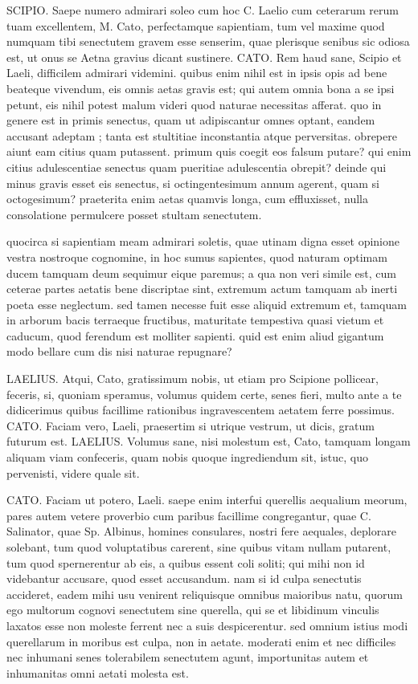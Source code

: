  SCIPIO. Saepe numero admirari soleo cum hoc C. Laelio cum ceterarum rerum tuam excellentem, M. Cato, perfectamque sapientiam, tum vel maxime quod numquam tibi senectutem gravem esse senserim, quae plerisque senibus sic odiosa est, ut onus se Aetna gravius dicant sustinere. CATO. Rem haud sane, Scipio et Laeli, difficilem admirari videmini. quibus enim nihil est in ipsis opis ad bene beateque vivendum, eis omnis aetas gravis est; qui autem omnia bona a se ipsi petunt, eis nihil potest malum videri quod naturae necessitas afferat. quo in genere est in primis senectus, quam ut adipiscantur omnes optant, eandem accusant adeptam ; tanta est stultitiae inconstantia atque perversitas. obrepere aiunt eam citius quam putassent. primum quis coegit eos falsum putare? qui enim citius adulescentiae senectus quam pueritiae adulescentia obrepit? deinde qui minus gravis esset eis senectus, si octingentesimum annum agerent, quam si octogesimum? praeterita enim aetas quamvis longa, cum effluxisset, nulla consolatione permulcere posset stultam senectutem.

 quocirca si sapientiam meam admirari soletis, quae utinam digna esset opinione vestra nostroque cognomine, in hoc sumus sapientes, quod naturam optimam ducem tamquam deum sequimur eique paremus; a qua non veri simile est, cum ceterae partes aetatis bene discriptae sint, extremum actum tamquam ab inerti poeta esse neglectum. sed tamen necesse fuit esse aliquid extremum et, tamquam in arborum bacis terraeque fructibus, maturitate tempestiva quasi vietum et caducum, quod ferendum est molliter sapienti. quid est enim aliud gigantum modo bellare cum dis nisi naturae repugnare?

 LAELIUS. Atqui, Cato, gratissimum nobis, ut etiam pro Scipione pollicear, feceris, si, quoniam speramus, volumus quidem certe, senes fieri, multo ante a te didicerimus quibus facillime rationibus ingravescentem aetatem ferre possimus. CATO. Faciam vero, Laeli, praesertim si utrique vestrum, ut dicis, gratum futurum est. LAELIUS. Volumus sane, nisi molestum est, Cato, tamquam longam aliquam viam confeceris, quam nobis quoque ingrediendum sit, istuc, quo pervenisti, videre quale sit.

 CATO. Faciam ut potero, Laeli. saepe enim interfui querellis aequalium meorum, pares autem vetere proverbio cum paribus facillime congregantur, quae C. Salinator, quae Sp. Albinus, homines consulares, nostri fere aequales, deplorare solebant, tum quod voluptatibus carerent, sine quibus vitam nullam putarent, tum quod spernerentur ab eis, a quibus essent coli soliti; qui mihi non id videbantur accusare, quod esset accusandum. nam si id culpa senectutis accideret, eadem mihi usu venirent reliquisque omnibus maioribus natu, quorum ego multorum cognovi senectutem sine querella, qui se et libidinum vinculis laxatos esse non moleste ferrent nec a suis despicerentur. sed omnium istius modi querellarum in moribus est culpa, non in aetate. moderati enim et nec difficiles nec inhumani senes tolerabilem senectutem agunt, importunitas autem et inhumanitas omni aetati molesta est.

